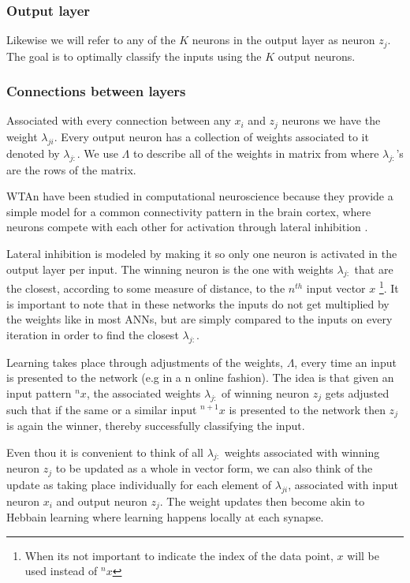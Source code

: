 \documentclass{article}
\begin{document}
\subsubsection*{Output layer}
Likewise we will refer to any of the \(K\) neurons in the output layer as neuron \(z_j\). The goal is to optimally classify the inputs using the \(K\) output neurons. 

\subsubsection*{Connections between layers}
Associated with every connection between any \(x_i\) and \(z_j\) neurons we have the weight \(\lambda_{ji}\). Every output neuron has a collection of weights associated to it denoted by \(\lambda_{j:}\). We use \(\Lambda\) to describe all of the weights in matrix from where \(\lambda_{j:}\)'s are the rows of the matrix. 


WTAn have been studied in computational neuroscience because they provide a simple
model for a common connectivity pattern in the brain cortex, where
neurons compete with each other for activation through lateral
inhibition \cite{Keck2012}.

Lateral inhibition is modeled by making it so only one neuron is activated in the output layer per input. The winning neuron is the one with weights \(\lambda_{j:}\) that are the closest,
according to some measure of distance, to the \(n^{th}\) input vector
\(x\) \footnote{When its not important to indicate the index of the data point,
\(x\) will be used instead of \(^nx\)}. It is important to note that in these networks the inputs do not get multiplied by the weights like in most ANNs, but are simply compared to the inputs on every iteration in order to find the closest \(\lambda_{j:}\). 

Learning takes place through adjustments of the weights, \(\Lambda\), every time an input is presented to the network (e.g in a n online fashion). The idea is that given an input pattern
\(^nx\), the associated weights \(\lambda_{j:}\) of winning neuron
\(z_j\) gets adjusted such that if the same or a similar input
\(^{n+1}x\) is presented to the network then \(z_j\) is again the
winner, thereby successfully classifying the input. 

Even thou it is convenient to think of all \(\lambda_{j:}\) weights
associated with winning neuron \(z_j\) to be updated as a whole in
vector form, we can also think of the update as taking place
individually for each element of \(\lambda_{ji}\), associated with input
neuron \(x_i\) and output neuron \(z_j\). The weight updates then become
akin to Hebbain learning where learning happens locally at each synapse.
\end{document}
